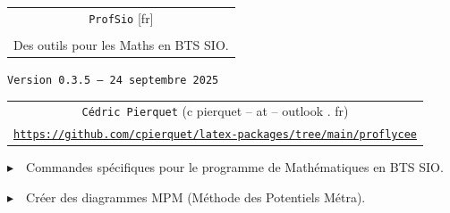 \documentclass[french,a4paper,11pt]{article}
\def\TPversion{0.3.5}
\def\TPdate{24 septembre 2025}
\begin{document}
\setlength{\aweboxleftmargin}{0.07\linewidth}
\setlength{\aweboxcontentwidth}{0.93\linewidth}
\setlength{\aweboxvskip}{8pt}

\pagestyle{fancy}

\thispagestyle{empty}

\vspace{2cm}

\begin{center}
	\begin{minipage}{0.75\linewidth}
	\begin{tcolorbox}[colframe=yellow,colback=yellow!15]
		\begin{center}
			\begin{tabular}{c}
				{\Huge \texttt{ProfSio} [fr]}\\
				\\
				{\LARGE Des outils pour les Maths en BTS SIO.} \\
			\end{tabular}
			
			\bigskip
			
			{\small \texttt{Version \TPversion{} -- \TPdate}}
		\end{center}
	\end{tcolorbox}
\end{minipage}
\end{center}

\begin{center}
	\begin{tabular}{c}
	\texttt{Cédric Pierquet} ({\ttfamily c pierquet -- at -- outlook . fr})\\
	\texttt{\url{https://github.com/cpierquet/latex-packages/tree/main/proflycee}}
\end{tabular}
\end{center}

\vspace{0.15cm}

{$\blacktriangleright$~~Commandes spécifiques pour le programme de Mathématiques en BTS SIO\footnotemark{}.}

\vspace{0.15cm}

{$\blacktriangleright$~~Créer des diagrammes MPM\footnotemark{} (Méthode des Potentiels Métra).}
\end{document}
